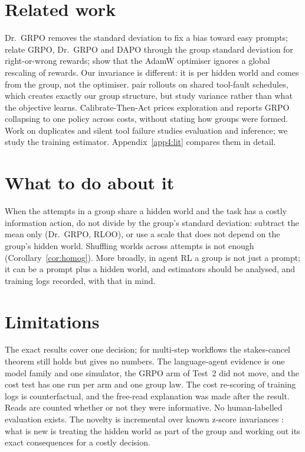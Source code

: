 \documentclass[11pt]{article}
\begin{document}
\section{Related work}\label{sec:related}
Dr.~GRPO \citep{liu2025drgrpo} removes the standard deviation to fix a bias toward easy prompts;
\citet{bay2026grpodrgrpodapo} relate GRPO, Dr.~GRPO and DAPO through the group standard deviation for right-or-wrong
rewards; \citet{fontana-etal-2026-hidden} show that the AdamW optimiser ignores a global rescaling of rewards. Our
invariance is different: it is per hidden world and comes from the group, not the optimiser. \citet{sakib2026luck}
pair rollouts on shared tool-fault schedules, which creates exactly our group structure, but study variance rather
than what the objective learns. Calibrate-Then-Act \citep{ding2026calibratethenactcostawareexplorationllm} prices
exploration and reports GRPO collapsing to one policy across costs, without stating how groups were formed. Work on
duplicates and silent tool failure \citep{li2026doesexactlyoncelivemodel,zhu2026evidenceguidedrecoveryaiagents,kaynar2026toolsfailagentsfabricate}
studies evaluation and inference; we study the training estimator. Appendix~\ref{app4:lit} compares them in detail.

\section{What to do about it}\label{sec:disc}
When the attempts in a group share a hidden world and the task has a costly information action, do not divide by the
group's standard deviation: subtract the mean only (Dr.~GRPO, RLOO), or use a scale that does not depend on the
group's hidden world. Shuffling worlds across attempts is not enough (Corollary~\ref{cor:homog}). More broadly, in agent
RL a group is not just a prompt; it can be a prompt plus a hidden world, and estimators should be analysed, and
training logs recorded, with that in mind.

\section*{Limitations}
The exact results cover one decision; for multi-step workflows the stakes-cancel theorem still holds but gives no
numbers. The language-agent evidence is one model family and one simulator, the GRPO arm of Test~2 did not move, and
the cost test has one run per arm and one group law. The cost re-scoring of training logs is
counterfactual, and the free-read explanation was made after the result. Reads are counted whether or not they were
informative. No human-labelled evaluation exists. The novelty is incremental over known z-score invariances
\citep{wang2026darkroom}: what is new is treating the hidden world as part of the group and working out its exact
consequences for a costly decision.
\end{document}
